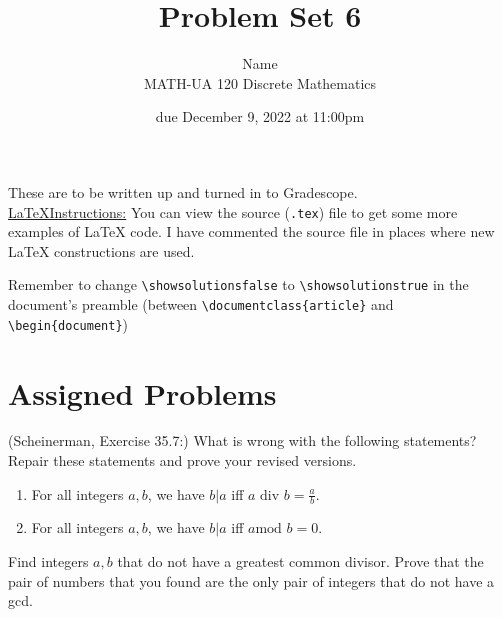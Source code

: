 \documentclass{article}
\title{Problem Set 6}
\author{%
    Name
\\  MATH-UA 120 Discrete Mathematics
}
\date{due December 9, 2022 at 11:00pm}
\newif\ifshowsolutions
\newcommand{\danger}{\marginpar[\hfill\dbend]{\dbend\hfill}}
\newcommand{\modulo}{\text{mod }}
\newcommand{\divisor}{\text{ div }}
\theoremstyle{definition}
\begin{document}
\maketitle



These are to be written up and turned in to Gradescope.\\



\ifshowsolutions
    \SetupExSheets{solution/print=true}
\else
    \danger
 \underline{ \LaTeX  Instructions:}  You can view the source (\texttt{.tex}) file to get some more examples of \LaTeX{} code.  I have commented the source file in places where new \LaTeX{} constructions are used.
  
  Remember to change \verb|\showsolutionsfalse| to \verb|\showsolutionstrue|
    in the document's preamble 
    (between \verb|\documentclass{article}| and \verb|\begin{document}|)
\fi

\section*{Assigned Problems}



\begin{question}
    (Scheinerman, Exercise 35.7:)
    What is wrong with the following statements?  Repair these statements and prove your revised versions.
    \begin{enumerate}
	\item For all integers $a, b$, we have $b |a$ iff  $a \divisor b = \frac{a}{b}$.
	\item For all integers $a, b$, we have $b|a$ iff $a \modulo b = 0$.
    \end{enumerate}
\end{question}
\begin{solution}
\end{solution}

\begin{question}
    Find integers $a, b$ that do not have a greatest common divisor.  Prove that the pair of numbers that you found are the only pair of integers that do not have a gcd.
\end{question}
\begin{solution}
\end{solution}
\end{document}
